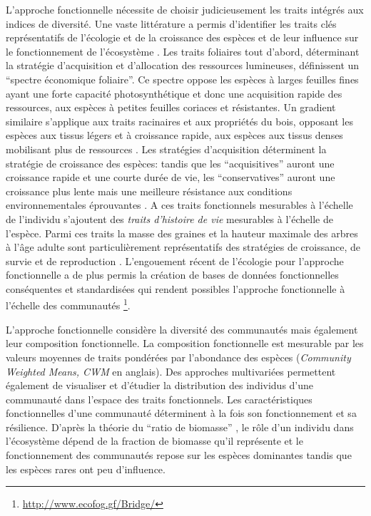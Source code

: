 \documentclass[
  11pt,
  french,
  A4paper,
  extrafontsizes,onecolumn,openright
  ]{memoir}
\begin{document}
L'approche fonctionnelle nécessite de choisir judicieusement les traits
intégrés aux indices de diversité. Une vaste littérature a permis
d'identifier les traits clés représentatifs de l'écologie et de la
croissance des espèces et de leur influence sur le fonctionnement de
l'écosystème \autocite{Reich2014}. Les traits foliaires tout d'abord,
déterminant la stratégie d'acquisition et d'allocation des ressources
lumineuses, définissent un ``spectre économique foliaire''. Ce spectre
oppose les espèces à larges feuilles fines ayant une forte capacité
photosynthétique et donc une acquisition rapide des ressources, aux
espèces à petites feuilles coriaces et résistantes. Un gradient
similaire s'applique aux traits racinaires et aux propriétés du bois,
opposant les espèces aux tissus légers et à croissance rapide, aux
espèces aux tissus denses mobilisant plus de ressources
\autocites{Chave2009}{Valverde-Barrantes2017}. Les stratégies
d'acquisition déterminent la stratégie de croissance des espèces: tandis
que les ``acquisitives'' auront une croissance rapide et une courte
durée de vie, les ``conservatives'' auront une croissance plus lente
mais une meilleure résistance aux conditions environnementales
éprouvantes \autocites{Reich1997}{Wright2004}. A ces traits fonctionnels
mesurables à l'échelle de l'individu s'ajoutent des \emph{traits
d'histoire de vie} mesurables à l'échelle de l'espèce. Parmi ces traits
la masse des graines et la hauteur maximale des arbres à l'âge adulte
sont particulièrement représentatifs des stratégies de croissance, de
survie et de reproduction \autocites{Westoby1998}{Herault2011}.
L'engouement récent de l'écologie pour l'approche fonctionnelle a de
plus permis la création de bases de données fonctionnelles conséquentes
et standardisées qui rendent possibles l'approche fonctionnelle à
l'échelle des communautés \autocites{Kattge2011}{Perez-Harguindeguy2013}
\footnote{\url{http://www.ecofog.gf/Bridge/}}.

L'approche fonctionnelle considère la diversité des communautés mais
également leur composition fonctionnelle. La composition fonctionnelle
est mesurable par les valeurs moyennes de traits pondérées par
l'abondance des espèces (\emph{Community Weighted Means, CWM} en
anglais). Des approches multivariées permettent également de visualiser
et d'étudier la distribution des individus d'une communauté dans
l'espace des traits fonctionnels. Les caractéristiques fonctionnelles
d'une communauté déterminent à la fois son fonctionnement et sa
résilience. D'après la théorie du ``ratio de biomasse''
\autocite{Grime1998}, le rôle d'un individu dans l'écosystème dépend de
la fraction de biomasse qu'il représente et le fonctionnement des
communautés repose sur les espèces dominantes tandis que les espèces
rares ont peu d'influence.
\end{document}
